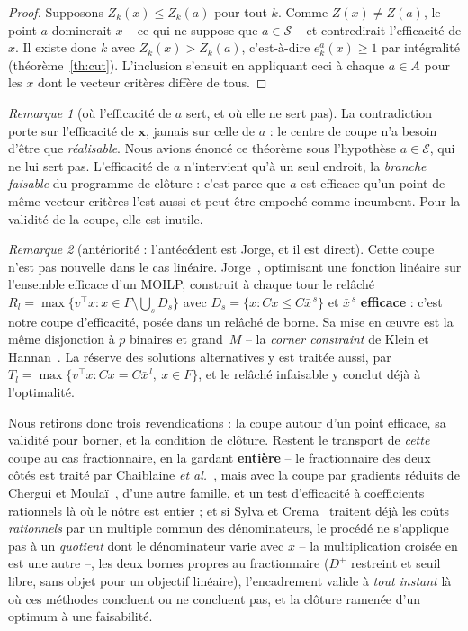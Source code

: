 \documentclass[11pt,a4paper]{article}
\theoremstyle{plain}
\theoremstyle{remark}
\newtheorem{remark}{Remarque}
\newcommand{\Ecal}{\mathcal{E}}
\newcommand{\Scal}{\mathcal{S}}
\begin{document}
\begin{proof}
Supposons $Z_k(x)\le Z_k(a)$ pour tout $k$. Comme $Z(x)\ne Z(a)$, le point
$a$ dominerait $x$ -- ce qui ne suppose que $a\in\Scal$ -- et contredirait
l'efficacité de $x$. Il existe donc $k$
avec $Z_k(x)>Z_k(a)$, c'est-à-dire $e^a_k(x)\ge 1$ par intégralité
(théorème~\ref{th:cut}). L'inclusion s'ensuit en appliquant ceci à chaque
$a\in A$ pour les $x$ dont le vecteur critères diffère de tous.
\end{proof}

\begin{remark}[où l'efficacité de $a$ sert, et où elle ne sert pas]
\label{rem:aeff}
La contradiction porte sur l'efficacité de $\mathbf{x}$, jamais sur celle de
$a$ : le centre de coupe n'a besoin d'être que \emph{réalisable}. Nous
avions énoncé ce théorème sous l'hypothèse $a\in\Ecal$, qui ne lui sert pas.
L'efficacité de $a$ n'intervient qu'à un seul endroit, la \emph{branche
faisable} du programme de clôture : c'est parce que $a$ est efficace qu'un
point de même vecteur critères l'est aussi et peut être empoché comme
incumbent. Pour la validité de la coupe, elle est inutile.
\end{remark}

\begin{remark}[antériorité : l'antécédent est Jorge, et il est direct]
\label{rem:anteriorite}
Cette coupe n'est pas nouvelle dans le cas linéaire.
Jorge~\cite{jorge2009}, optimisant une fonction linéaire sur l'ensemble
efficace d'un MOILP, construit à chaque tour le relâché
$R_l=\max\{v^{\top}x : x\in F\setminus\bigcup_s D_s\}$ avec
$D_s=\{x : Cx\le C\bar x^{\,s}\}$ et $\bar x^{\,s}$ \textbf{efficace} :
c'est notre coupe d'efficacité, posée dans un relâché de borne. Sa mise en
{\oe}uvre est la même disjonction à $p$ binaires et grand~$M$ -- la
\emph{corner constraint} de Klein et Hannan~\cite{klein1982}. La réserve
des solutions alternatives y est traitée aussi, par
$T_l=\max\{v^{\top}x : Cx=C\bar x^{\,l},\ x\in F\}$, et le relâché
infaisable y conclut déjà à l'optimalité.

Nous retirons donc trois revendications : la coupe autour d'un point
efficace, sa validité pour borner, et la condition de clôture. Restent le
transport de \emph{cette} coupe au cas fractionnaire, en la gardant
\textbf{entière} -- le fractionnaire des deux côtés est traité par
Chaiblaine \emph{et al.}~\cite{chaiblaine2020}, mais avec la coupe par
gradients réduits de Chergui et Moulaï~\cite{chergui2008}, d'une autre
famille, et un test d'efficacité à coefficients rationnels là où le nôtre
est entier ; et si Sylva et Crema~\cite{sylva2004} traitent déjà les coûts
\emph{rationnels} par un multiple commun des dénominateurs, le procédé ne
s'applique pas à un \emph{quotient} dont le dénominateur varie avec $x$ --
la multiplication croisée en est une autre --, les deux bornes propres au fractionnaire ($D^{+}$ restreint
et seuil libre, sans objet pour un objectif linéaire), l'encadrement valide
à \emph{tout instant} là où ces méthodes concluent ou ne concluent pas, et
la clôture ramenée d'un optimum à une faisabilité.
\end{remark}
\end{document}
